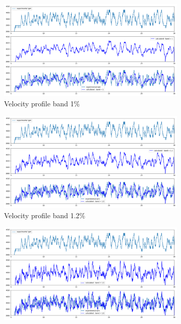\documentclass[10pt,fleqn,a4paper,twoside]{article}
\begin{document}
\begin{figure}[H]
    \begin{subfigure}{0.4\textwidth}
        \includegraphics[width=\textwidth]{Figures/rpm_analysis_mic0_band_1.png}
        \caption{Velocity profile band 1\%}
        \label{fig:fourth}
    \end{subfigure}
    \centering
    \hfill
    \begin{subfigure}{0.4\textwidth}
        \includegraphics[width=\textwidth]{Figures/rpm_analysis_mic0_band_1.2.png}
        \caption{Velocity profile band 1.2\%}
        \label{fig:fifth}
    \end{subfigure}
    \centering
    \hfill
    \begin{subfigure}{0.4\textwidth}
        \includegraphics[width=\textwidth]{Figures/rpm_analysis_mic0_band_1.5.png}

\end{subfigure}
\end{figure}
\end{document}
